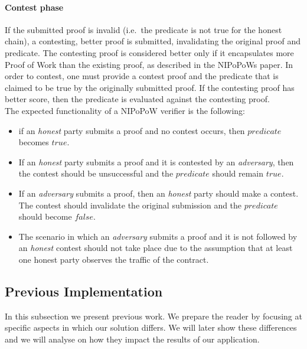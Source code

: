 \paragraph{Contest phase} If the submitted proof is invalid (i.e.\ the
predicate is not true for the honest chain), a contesting, better proof is
submitted, invalidating the original proof and predicate. The contesting proof
is considered better only if it encapsulates more Proof of Work than the
existing proof, as described in the NIPoPoWs paper. In order to contest, one
must provide a contest proof and the predicate that is claimed to be true by
the originally submitted proof. If the contesting proof has better score, then
the predicate is evaluated against the contesting proof.\\

The expected functionality of a NIPoPoW verifier is the following:
\begin{itemize}

    \item
        if an \textit{honest} party submits a proof and no contest occurs, then
        $predicate$ becomes $true$.

    \item
        If an \textit{honest} party submits a proof and it is contested by an
        \textit{adversary}, then the contest should be unsuccessful and the
        $predicate$ should remain $true$.

    \item
        If an \textit{adversary} submits a proof, then an \textit{honest} party
        should make a contest. The contest should invalidate the original
        submission and the $predicate$ should become $false$.

    \item
        The scenario in which an \textit{adversary} submits a proof and it is not
        followed by an \textit{honest} contest should not take place due to the
        assumption that at least one honest party observes the traffic of the
        contract.

\end{itemize}

\subsection{Previous Implementation}

In this subsection we present previous work. We prepare the reader by focusing
at specific aspects in which our solution differs. We will later show these
differences and we will analyse on how they impact the results of our
application.

